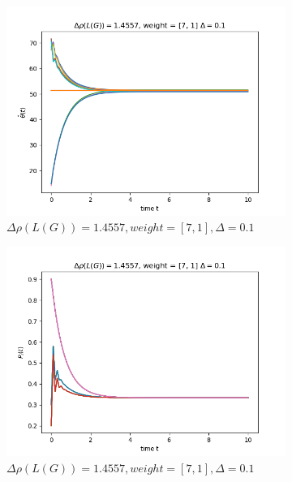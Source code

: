 \documentclass{article}
\begin{document}
\begin{problem}
\begin{figure}[!h]
\begin{subfigure}{0.4\textwidth}
            \includegraphics[width=\textwidth]{./img/Figure_12.png}
            \caption{$\Delta \rho (L(G)) = 1.4557, weight = [7,1], \Delta = 0.1$}
        \end{subfigure}
        \begin{subfigure}{0.4\textwidth}
            \includegraphics[width=\textwidth]{./img/Figure_13.png}
            \caption{$\Delta \rho (L(G)) = 1.4557, weight = [7,1], \Delta = 0.1$}
        \end{subfigure}
        \begin{subfigure}{0.4\textwidth}

\end{subfigure}
\end{figure}
\end{problem}
\end{document}
